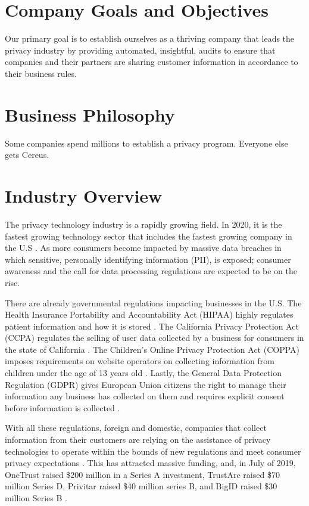 \section{Company Goals and Objectives}

Our primary goal is to establish ourselves as a thriving company that leads the privacy industry by providing automated, insightful, audits to ensure that companies and their partners are sharing customer information in accordance to their business rules.

\section{Business Philosophy}

Some companies spend millions to establish a privacy program. Everyone else gets Cereus.

\section{Industry Overview}

The privacy technology industry is a rapidly growing field. In 2020, it is the fastest growing technology sector that includes the fastest growing company in the U.S \cite{hughes.iapp.2020}. As more consumers become impacted by massive data breaches in which sensitive, personally identifying information (PII), is exposed; consumer awareness and the call for data processing regulations are expected to be on the rise.

There are already governmental regulations impacting businesses in the U.S. The Health Insurance Portability and Accountability Act (HIPAA) highly regulates patient information and how it is stored \cite{cdc.2018}. The California Privacy Protection Act (CCPA) regulates the selling of user data collected by a business for consumers in the state of California \cite{calleg.2018}. The Children's Online Privacy Protection Act (COPPA) imposes requirements on website operators on collecting information from children under the age of 13 years old \cite{ftc.1998}. Lastly, the General Data Protection Regulation (GDPR) gives European Union citizens the right to manage their information any business has collected on them and requires explicit consent before information is collected \cite{eucomm.2016}.

With all these regulations, foreign and domestic, companies that collect information from their customers are relying on the assistance of privacy technologies to operate within the bounds of new regulations and meet consumer privacy expectations \cite{meehan.forbes.2019}. This has attracted massive funding, and, in July of 2019, OneTrust raised \$200 million in a Series A investment, TrustArc raised \$70 million Series D, Privitar raised \$40 million series B, and BigID raised \$30 million Series B \cite{wood.fpf.2019}.

